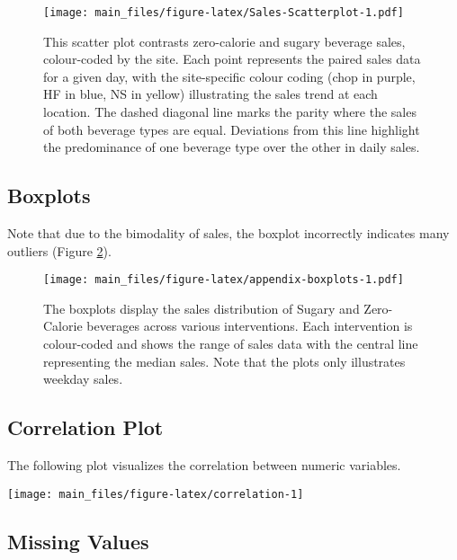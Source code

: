 \documentclass[
]{article}
\begin{document}
\begin{figure}
\centering
\texttt{[image: main\_files/figure-latex/Sales-Scatterplot-1.pdf]}
\caption{\label{fig:Sales-Scatterplot}This scatter plot contrasts zero-calorie and sugary beverage sales, colour-coded by the site. Each point represents the paired sales data for a given day, with the site-specific colour coding (chop in purple, HF in blue, NS in yellow) illustrating the sales trend at each location. The dashed diagonal line marks the parity where the sales of both beverage types are equal. Deviations from this line highlight the predominance of one beverage type over the other in daily sales.}
\end{figure}

\hypertarget{boxplots}{%
\subsection{Boxplots}\label{boxplots}}

Note that due to the bimodality of sales, the boxplot incorrectly indicates many outliers (Figure \ref{fig:appendix-boxplots}).

\begin{figure}
\centering
\texttt{[image: main\_files/figure-latex/appendix-boxplots-1.pdf]}
\caption{\label{fig:appendix-boxplots}The boxplots display the sales distribution of Sugary and Zero-Calorie beverages across various interventions. Each intervention is colour-coded and shows the range of sales data with the central line representing the median sales. Note that the plots only illustrates weekday sales.}
\end{figure}

\hypertarget{correlation-plot-1}{%
\subsection{Correlation Plot}\label{correlation-plot-1}}

The following plot visualizes the correlation between numeric variables.

\begin{center}\texttt{[image: main\_files/figure-latex/correlation-1]} \end{center}

\hypertarget{missing-values}{%
\subsection{Missing Values}\label{missing-values}}
\end{document}
